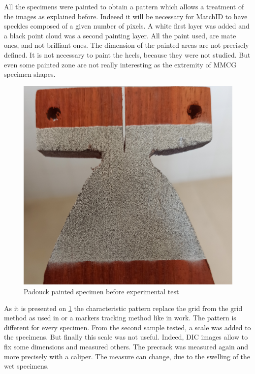 All the specimens were painted to obtain a pattern which allows a treatment of the images as explained before. Indeeed it will be necessary for MatchID to have speckles composed of a given number of pixels. A white first layer was added and a black point cloud was a second painting layer. All the paint used, are mate ones, and not brilliant ones. The dimension of the painted areas are not precisely defined. It is not necessary to paint the heels, because they were not studied. But even some painted zone are not really interesting as the extremity of MMCG specimen shapes. 
\begin{figure}[th]
	\centering
	\includegraphics[scale=0.08]{Figures/Painted_specimen}
	\caption[Padouck painted specimen]{Padouck painted specimen before experimental test}
	\label{fig:paintedSpec}
\end{figure}
As it is presented on \ref{fig:paintedSpec} the characteristic pattern replace the grid from the grid method as used in \parencite{Reference7} or a markers tracking method like in \parencite{Reference18} work. The pattern is different for every specimen. From the second sample tested, a scale was added to the specimens. But finally this scale was not useful. Indeed, DIC images allow to fix some dimensions and measured others.
The precrack was measured again and more precisely with a caliper. The measure can change, due to the swelling of the wet specimens.

